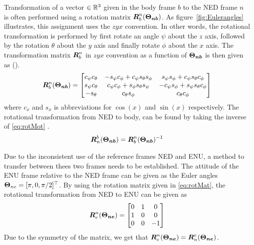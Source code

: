 Transformation of a vector $\in \mathbb{R}^3$ given in the body frame $b$ to the NED frame $n$ is often performed using a rotation matrix $\boldsymbol{R}_b^n(\boldsymbol{\Theta_{nb}})$. As figure~\ref{fig:Eulerangles} illustrates, this assignment uses the $zyx$ convention. In other words, the rotational transformation is performed by first rotate an angle $\psi$ about the $z$ axis, followed by the rotation $\theta$ about the $y$ axis and finally rotate $\phi$ about the $x$ axis. The transformation matrix $\boldsymbol{R}_b^n$ in $zyx$ convention as a function of $\boldsymbol{\Theta_{nb}}$ is then given as (\cite{Fossen2011}).
\begin{equation}\label{eq:rotMat}
\boldsymbol{R}_b^n(\boldsymbol{\Theta_{nb}})=
  \begin{bmatrix}
    c_\psi c_\theta & -s_\psi c_\phi+c_\psi s_\theta s_\phi & s_\psi s_\phi+c_\psi s_\theta c_\phi\\
    s_\psi c_\theta & c_\psi c_\phi+s_\phi s_\theta s_\psi & -c_\psi s_\phi+s_\psi s_\theta c_\phi\\
    -s_\theta & c_\theta s_\phi & c_\theta c_\phi
  \end{bmatrix}
\end{equation}
where $c_x$ and $s_x$ is abbreviations for $\cos(x)$ and $\sin(x)$ respectively. The rotational transformation from NED to body, can be found by taking the inverse of \ref{eq:rotMot} \citep{Fossen2011}.
\begin{equation}
  \boldsymbol{R}_n^b(\boldsymbol{\Theta_{nb}})=\boldsymbol{R}_b^n(\boldsymbol{\Theta_{nb}})^{-1}
\end{equation}

Due to the inconsistent use of the reference frames NED and ENU, a method to transfer between thees two frames needs to be established. The attitude of the ENU frame relative to the NED frame can be given as the Euler angles $\boldsymbol{\Theta}_{ne}=[\pi,0,\pi/2]^{\top}$. By using the rotation matrix given in \ref{eq:rotMat}, the rotational transformation from NED to ENU can be given as
\begin{equation}\label{eq:rotMatENU2NED}
  \boldsymbol{R}_e^n(\boldsymbol{\Theta_{ne}})=
  \begin{bmatrix}
    0 & 1 & 0\\
    1 & 0 & 0\\
    0 & 0 & -1
  \end{bmatrix}
\end{equation}
Due to the symmetry of the matrix, we get that $\boldsymbol{R}_e^n(\boldsymbol{\Theta_{ne}})=\boldsymbol{R}_n^e(\boldsymbol{\Theta_{ne}})$.

